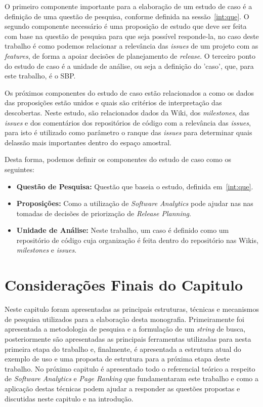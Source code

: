 O primeiro componente importante para a elaboração de um estudo de caso é a definição de uma questão de pesquisa, conforme definida na sessão~\ref{int:que}. O segundo componente necessário é uma proposição de estudo que deve ser feita com base na questão de pesquisa para que seja possível responde-la, no caso deste trabalho é como podemos relacionar a relevância das \textit{issues} de um projeto com as \textit{features}, de forma a apoiar decisões de planejamento de \textit{release}. O terceiro ponto do estudo de caso é a unidade de análise, ou seja a definição do 'caso', que, para este trabalho, é o SBP.

Os próximos componentes do estudo de caso estão relacionados a como os dados das proposições estão unidos e quais são critérios de interpretação das descobertas. Neste estudo, são relacionados dados da Wiki, dos \textit{milestones}, das \textit{issues} e dos comentários dos repositórios de código com a relevância das \textit{issues}, para isto é utilizado como parâmetro o ranque das \textit{issues} para determinar quais delassão mais importantes dentro do espaço amostral.

Desta forma, podemos definir os componentes do estudo de caso como os seguintes:

\begin{itemize}
    \item \textbf{Questão de Pesquisa:} Questão que baseia o estudo, definida em~\ref{int:que}.
    \item \textbf{Proposições:} Como a utilização de \textit{Software Analytics} pode ajudar nas
    nas tomadas de decisões de priorização de \textit{Release Planning}.
    \item \textbf{Unidade de Análise:} Neste trabalho, um caso é definido como um repositório
        de código cuja organização é feita dentro do repositório nas Wikis, \textit{milestones}
        e \textit{issues}.
\end{itemize}

\section{Considerações Finais do Capitulo}
Neste capitulo foram apresentadas as principais estruturas, técnicas e mecanismos de pesquisa utilizados para a elaboração desta monografia. Primeiramente foi apresentada a metodologia de pesquisa e a formulação de um \textit{string} de busca, posteriormente são apresentadas as principais ferramentas utilizadas para nesta primeira etapa do trabalho e, finalmente, é apresentada a estrutura atual do exemplo de uso e uma proposta de estrutura para a próxima etapa deste trabalho. No próximo capitulo é apresentado todo o referencial teórico a respeito de \textit{Software Analytics} e \textit{Page Ranking} que fundamentaram este trabalho e como a aplicação destas técnicas podem ajudar a responder as questões propostas e discutidas neste capitulo e na introdução.


